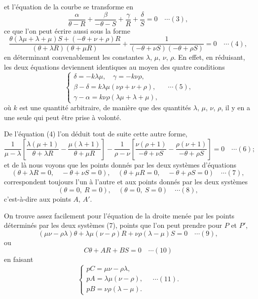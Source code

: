 \documentclass[12pt,a4paper]{article}
\begin{document}
et l'\'equation de la courbe se transforme en
\[
\frac{\alpha}{\theta - R} + \frac{\beta}{-\theta - S} + \frac{\gamma}{R} + \frac{\delta}{S} = 0 \quad\cdots(3),
\]
ce que l'on peut \'ecrire aussi sous la forme
\[
\frac{\theta(\lambda\mu + \lambda + \mu)S + (-\theta + \nu + \rho)R}{(\theta + \lambda R)(\theta + \mu R)} + \frac{1}{(-\theta + \nu S)(-\theta + \rho S)} = 0 \quad\cdots(4),
\]
en d\'eterminant convenablement les constantes $\lambda$, $\mu$, $\nu$, $\rho$. En effet, en r\'eduisant, les deux \'equations deviennent identiques au moyen des quatre conditions
\[
\left\{\begin{array}{l}
\delta = -k\lambda\mu,\quad \gamma = -k\nu\rho,\\[2pt]
\beta - \delta = k\lambda\mu(\nu\rho + \nu + \rho),\\[2pt]
\gamma - \alpha = k\nu\rho(\lambda\mu + \lambda + \mu),
\end{array}\right. \quad\cdots(5),
\]
o\`u $k$ est une quantit\'e arbitraire, de mani\`ere que des quantit\'es $\lambda$, $\mu$, $\nu$, $\rho$, il y en a une seule qui peut \^etre prise \`a volont\'e.

De l'\'equation (4) l'on d\'eduit tout de suite cette autre forme,
\[
\frac{1}{\mu - \lambda}\left[\frac{\lambda(\mu + 1)}{\theta + \lambda R} - \frac{\mu(\lambda + 1)}{\theta + \mu R}\right] - \frac{1}{\rho - \nu}\left[\frac{\nu(\rho + 1)}{-\theta + \nu S} - \frac{\rho(\nu + 1)}{-\theta + \rho S}\right] = 0 \quad\cdots(6);
\]
et de l\`a nous voyons que les points donn\'es par les deux syst\`emes d'\'equations
\[
(\theta + \lambda R = 0,\quad -\theta + \nu S = 0),\quad (\theta + \mu R = 0,\quad -\theta + \rho S = 0) \quad\cdots(7),
\]
correspondent toujours l'un \`a l'autre et aux points donn\'es par les deux syst\`emes
\[
(\theta = 0,\ R = 0),\quad (\theta = 0,\ S = 0) \quad\cdots(8),
\]
c'est-\`a-dire aux points $A$, $A'$.

On trouve assez facilement pour l'\'equation de la droite men\'ee par les points d\'etermin\'es par les deux syst\`emes (7), points que l'on peut prendre pour $P$ et $P'$,
\[
(\mu\nu - \rho\lambda)\theta + \lambda\mu(\nu - \rho)R + \nu\rho(\lambda - \mu)S = 0 \quad\cdots(9),
\]
ou
\[
C\theta + AR + BS = 0 \quad\cdots(10)
\]
en faisant
\[
\left\{\begin{array}{l}
pC = \mu\nu - \rho\lambda,\\[2pt]
pA = \lambda\mu(\nu - \rho),\\[2pt]
pB = \nu\rho(\lambda - \mu).
\end{array}\right. \quad\cdots(11).
\]
\end{document}
